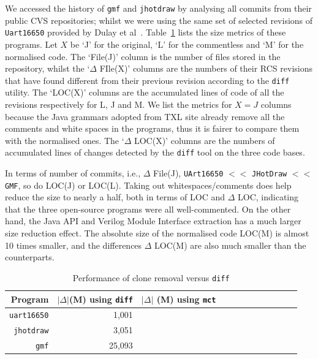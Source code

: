 \documentclass[10pt, conference, compsocconf]{IEEEtran}
\begin{document}
{We accessed the history of {\tt gmf} and {\tt jhotdraw} by analysing all commits from their public CVS repositories; whilst we were using the same set of selected revisions of {\tt Uart16650} provided by Dulay et al~\cite{Duley:2010:PDA:1858996.1859093}. Table~\ref{table:3} lists the size metrics of these programs. Let $X$ be `J' for the original, `L' for the commentless and `M' for the normalised code. The `File(J)' column is the number of files stored in the repository, whilst the `$\Delta$ FIle(X)' columns are the numbers of their RCS revisions that have found different from their previous revision according to the {\tt diff} utility. The `LOC(X)' columns are the accumulated lines of code of all the revisions respectively for L, J and M. We list the metrics for $X=J$ columns because the Java grammars adopted from TXL site already remove all the comments and white spaces in the programs, thus it is fairer to compare them with the normalised ones. The `$\Delta$ LOC(X)' columns are the numbers of accumulated lines of changes detected by the {\tt diff} tool on the three code bases. 

In terms of number of commits, i.e., $\Delta$ File(J),  {\tt UArt16650} $<<$ {\tt JHotDraw} $<<$ {\tt GMF}, so do LOC(J) or LOC(L). Taking out whitespaces/comments does help reduce the size to nearly a half, both in terms of LOC and $\Delta$ LOC, indicating that the three open-source programs were all well-commented. 
On the other hand, the Java API and Verilog Module Interface extraction has a much larger size reduction effect. The absolute size of the normalised code LOC(M) is almost 10 times smaller, and the differences $\Delta$ LOC(M) are also much smaller than the counterparts. 

\begin{table}\centering
\caption{Performance of clone removal versus {\tt diff}\label{table:3}}
\begin{tabular}{| r || r | r || r | r | r || r| r|  r || r | r | r |}\hline
{\bf Program} & \footnotesize  $|\Delta|$(M) using {\tt diff} & \footnotesize $|\Delta|$ (M) using {\tt mct}  \\  \hline\hline
{\tt uart16650} & 1,001 &\\\hline
{\tt jhotdraw} & 3,051 &\\\hline
{\tt gmf} & 25,093 &\\\hline
\hline\end{tabular}
\end{table}

}
\end{document}

